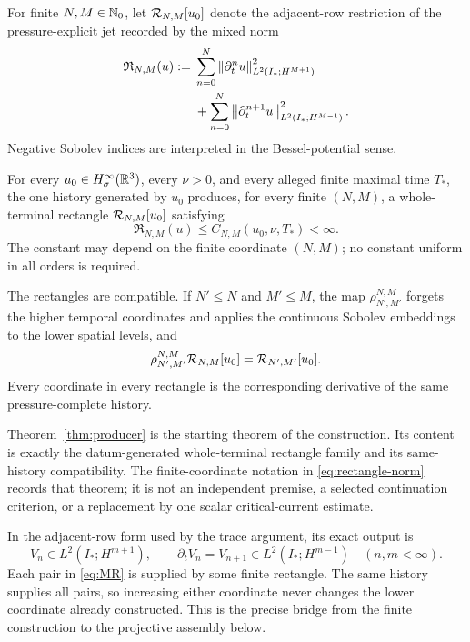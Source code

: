 For finite \(N,M\in\mathbb N_0\), let \(\mathcal R_{N,M}[u_0]\) denote the adjacent-row
restriction of the pressure-explicit jet recorded by the mixed norm
\begin{equation}
\begin{aligned}
 \mathfrak R_{N,M}(u)
 :={}&
 \sum_{n=0}^{N}
 \left\lVert \partial_t^n u\right\rVert_{L^2(I_*;H^{M+1})}^2
 \\
 &+
 \sum_{n=0}^{N}
 \left\lVert \partial_t^{n+1}u\right\rVert_{L^2(I_*;H^{M-1})}^2.
\end{aligned}
\label{eq:rectangle-norm}
\end{equation}
Negative Sobolev indices are interpreted in the Bessel-potential sense.

\begin{theorem}
\label{thm:producer}
For every \(u_0\in H^\infty_\sigma(\mathbb R^3)\), every \(\nu>0\), and every alleged
finite maximal time \(T_*\), the one history generated by \(u_0\) produces,
for every finite \((N,M)\), a whole-terminal rectangle
\(\mathcal R_{N,M}[u_0]\) satisfying
\begin{equation}
 \mathfrak R_{N,M}(u)
 \leq C_{N,M}(u_0,\nu,T_*)<\infty.
 \label{eq:producer-estimate}
\end{equation}
The constant may depend on the finite coordinate \((N,M)\); no constant
uniform in all orders is required.

The rectangles are compatible.  If \(N'\leq N\) and \(M'\leq M\), the map
\(\rho_{N',M'}^{N,M}\) forgets the higher temporal coordinates and applies the
continuous Sobolev embeddings to the lower spatial levels, and
\begin{equation}
 \rho_{N',M'}^{N,M}\mathcal R_{N,M}[u_0]
 =\mathcal R_{N',M'}[u_0].
 \label{eq:rectangle-compatibility}
\end{equation}
Every coordinate in every rectangle is the corresponding derivative of the
same pressure-complete history.
\end{theorem}

Theorem~\ref{thm:producer} is the starting theorem of the construction.  Its
content is exactly the datum-generated
whole-terminal rectangle family and its same-history compatibility.  The
finite-coordinate notation in \eqref{eq:rectangle-norm} records that theorem;
it is not an independent premise, a selected continuation criterion, or a
replacement by one scalar critical-current estimate.

In the adjacent-row form used by the trace argument, its exact output is
\begin{equation}
 V_n\in L^2(I_*;H^{m+1}),
 \qquad
 \partial_tV_n=V_{n+1}\in L^2(I_*;H^{m-1})
 \quad(n,m<\infty).
 \label{eq:MR}
\end{equation}
Each pair in \eqref{eq:MR} is supplied by some finite rectangle.  The same
history supplies all pairs, so increasing either coordinate never changes the
lower coordinate already constructed.  This is the precise bridge from the
finite construction to the projective assembly below.


